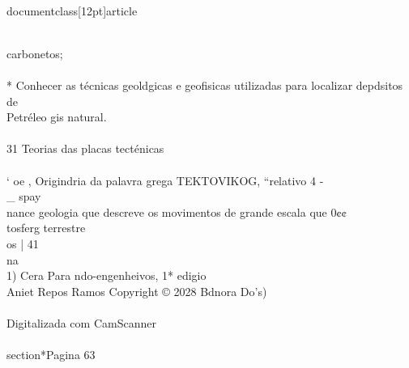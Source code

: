 \\documentclass[12pt]{article}
\begin{document}
\\
carbonetos;\\
\\
* Conhecer as técnicas geoldgicas e geofisicas utilizadas para localizar depdsitos de\\
Petréleo gis natural.\\
\\
31 Teorias das placas tecténicas\\
\\
‘ oe , Origindria da palavra grega TEKTOVIKOG, “relativo 4 -\\_ spay\\
nance geologia que descreve os movimentos de grande escala que 0¢¢\\
tosferg terrestre\\
os | 41\\
na\\
1) Cera Para ndo-engenheivos, 1* edigio\\
Aniet Repos Ramos Copyright © 2028 Bdnora Do's)\\
\\
Digitalizada com CamScanner\\

\\section*{Pagina 63}
\end{document}
